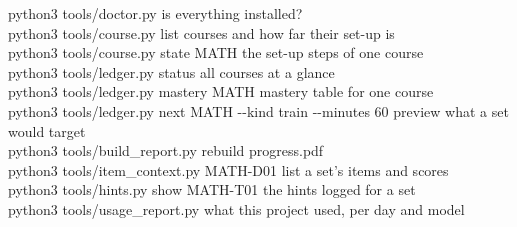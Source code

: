 \documentclass[a4paper,10pt]{article}
\begin{document}
\begin{tcolorbox}[enhanced,colback=white,colframe=muted!40,boxrule=0.4pt,arc=2pt,left=6pt,top=3pt,bottom=3pt]
\small\ttfamily
python3 tools/doctor.py \hfill{\normalfont\color{muted} is everything installed?}\\
python3 tools/course.py list \hfill{\normalfont\color{muted} courses and how far their set-up is}\\
python3 tools/course.py state MATH \hfill{\normalfont\color{muted} the set-up steps of one course}\\
python3 tools/ledger.py status \hfill{\normalfont\color{muted} all courses at a glance}\\
python3 tools/ledger.py mastery MATH \hfill{\normalfont\color{muted} mastery table for one course}\\
python3 tools/ledger.py next MATH -{}-kind train -{}-minutes 60 \hfill{\normalfont\color{muted} preview what a set would target}\\
python3 tools/build\_report.py \hfill{\normalfont\color{muted} rebuild progress.pdf}\\
python3 tools/item\_context.py MATH-D01 \hfill{\normalfont\color{muted} list a set's items and scores}\\
python3 tools/hints.py show MATH-T01 \hfill{\normalfont\color{muted} the hints logged for a set}\\
python3 tools/usage\_report.py \hfill{\normalfont\color{muted} what this project used, per day and model}
\end{tcolorbox}
\end{document}
